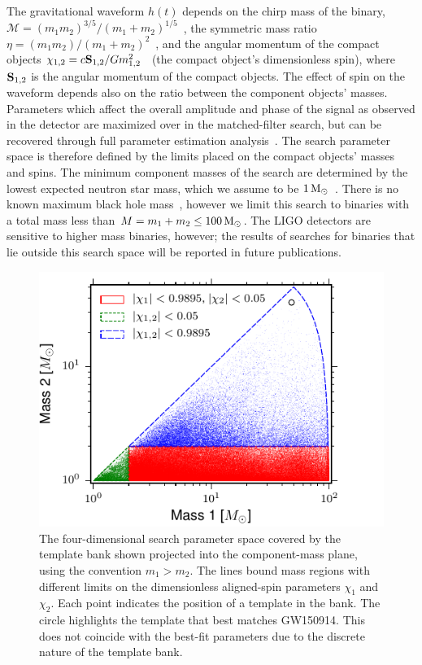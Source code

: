 The gravitational waveform $h(t)$ depends on the chirp mass of the binary,
$\mathcal{M} = (m_1 m_2)^{3/5} /
(m_1+m_2)^{1/5}$~\cite{PhysRev.131.435,Peters:1964}, the symmetric mass ratio
$\eta = (m_1 m_2) / (m_1 + m_2)^2$~\cite{Blanchet:1995ez}, and the angular
momentum of the compact objects $\chi_{1,2} = c{\bf
S}_{1,2}/Gm_{1,2}^2$~\cite{Kidder:1992fr,Kidder:1995zr} (the compact object's
dimensionless spin), where ${\bf S}_{1,2}$ is the angular momentum of the
compact objects. The effect of spin on the waveform depends also on the ratio
between the component objects' masses.  Parameters which affect the overall
amplitude and phase of the signal as observed in the detector are maximized
over in the matched-filter search, but can be recovered through full parameter
estimation analysis~\cite{GW150914-PARAMESTIM}.  The search parameter space is
therefore defined by the limits placed on the compact objects' masses and
spins.  The minimum component masses of the search are determined by the
lowest expected neutron star mass, which we assume to be
$1\,\mathrm{M}_\odot$~\cite{Miller:2014aaa}. There is no known maximum black hole
mass~\cite{Belczynski:2014iua}, however we limit this search to binaries with
a total mass less than $M = m_1 + m_2 \le 100\,\mathrm{M}_\odot$. The LIGO detectors
are sensitive to higher mass binaries, however; the results of searches for binaries
that lie outside this search space will be reported in future publications.
\begin{figure}[t]
\centering
\includegraphics[width=\textwidth]{figs/chapter2/uberbank_boundaries.pdf}
\caption{The four-dimensional search parameter space covered by the template
bank shown projected into the component-mass plane, using the convention 
$m_1 > m_2$. The lines bound mass regions with different limits on the
dimensionless aligned-spin parameters $\chi_1$ and $\chi_2$. Each point
indicates the position of a template in the bank. The circle highlights the
template that best matches GW150914. This does not coincide with the best-fit
parameters due to the discrete nature of the template bank.
\label{fig:uberbank_boundaries}}
\end{figure}

